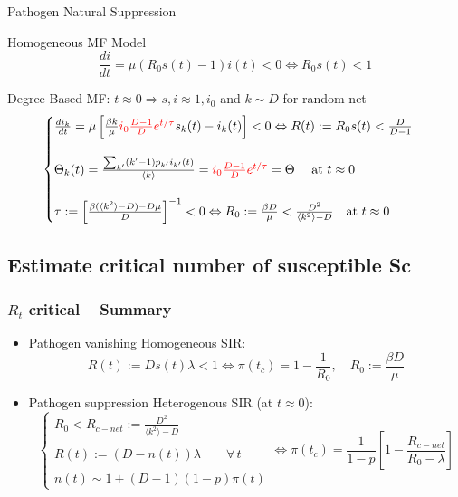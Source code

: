 \documentclass[xcolor={dvipsnames}]{beamer}
\begin{document}
\begin{frame}{Pathogen Natural Suppression}
	\vspace{-1mm}
	\begin{block}{Homogeneous MF Model}
		\begin{equation}
				\frac{di}{dt} = \mu( R_0 s(t) - 1) i(t) < 0 \Leftrightarrow R_0s(t) < 1
		\end{equation} 
	\end{block}
	\begin{block}{Degree-Based MF: $t \approx 0 \Rightarrow s,i \approx 1,i_0$ and $k\sim D$ for random net}
		\begin{equation}
			\begin{cases}
				\frac{di_k}{dt} = \mu \left[\frac{\beta k}{\mu} \textcolor{red}{i_0 \frac{ D - 1}{D} e^{t/\tau}}  s_k(t) - i_k(t) \right] < 0 \Leftrightarrow R(t):=R_0s(t) < \frac{D}{D-1}\\ \\
				\Theta_k(t) = \frac{\sum_{k'} (k'-1)p_{k'}i_{k'}(t)}{\langle k \rangle} =
				\textcolor{red}{i_0 \frac{ D - 1}{D} e^{t/\tau}} = \Theta \quad \textnormal{ at } t \approx 0 \\ \\
				\tau := \left[\frac{\beta(\langle k^2 \rangle -D)-D \mu}{D}\right]^{-1} < 0 	\Leftrightarrow 
						R_0 := \frac{\beta D}{\mu} < \frac{D^{2}}{\langle k^2 \rangle - D} \quad \textnormal{at } t \approx 0
			\end{cases}	
		\end{equation}
	\end{block}
\end{frame}

\subsection*{Estimate critical number of susceptible Sc}
\begin{frame}
	\frametitle{$R_t$ critical -- Summary}
	\begin{itemize}
		\item Pathogen vanishing Homogeneous SIR:
		\begin{equation}
			R(t):= D s(t) \lambda < 1 \Leftrightarrow  \pi(t_c) = 1 - \frac{1}{R_0}, \quad R_0 := \frac{\beta D}{\mu}
		\end{equation}
		\item Pathogen suppression Heterogenous SIR (at $t \approx 0$):	
		\begin{equation}
			\begin{cases}
				R_0 < R_{c-net} := \frac{D^{2}}{ \langle k^2 \rangle - D}\\ \\
				R(t):=(D-n(t))\lambda \qquad \forall \, t \\ \\
				n(t) \sim 1+(D-1)(1-p)\pi(t)
			\end{cases}
			\Leftrightarrow \pi(t_{c}) = \frac{1}{1-p} 
			\left[1- \frac{R_{c-net}}{R_0-\lambda} \right]
		\end{equation}
	\end{itemize}
\end{frame}
\end{document}
